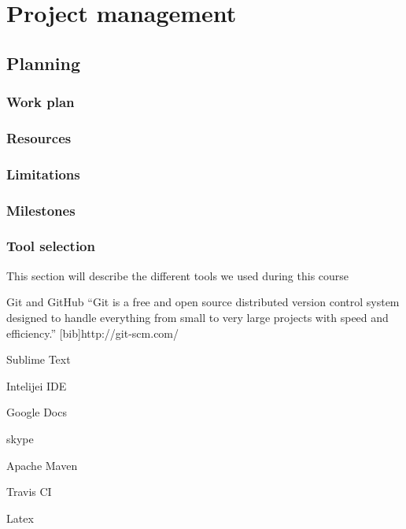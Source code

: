 
\chapter{Project management} %

\label{Project management} %


\section{Planning}
\subsection{Work plan}

\subsection{Resources}
\subsection{Limitations}

\subsection{Milestones}

\subsection{Tool selection}
This section will describe the different tools we used during this course

Git and GitHub
``Git is a free and open source distributed version control system designed to handle everything from small to very large projects with speed and efficiency.''
[bib]http://git-scm.com/

Sublime Text 

Intelijei IDE

Google Docs

skype

Apache Maven

Travis CI

Latex

